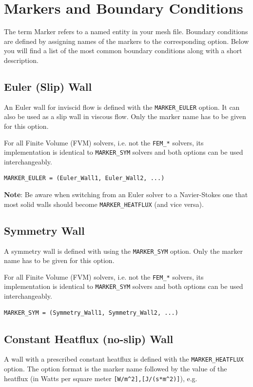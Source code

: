 \documentclass{article}
\begin{document}
\section{Markers and Boundary Conditions}

The term Marker refers to a named entity in your mesh file. Boundary conditions are defined by assigning names of the markers to the corresponding option. Below you will find a list of the most common boundary conditions along with a short description.

\subsection{Euler (Slip) Wall}
An Euler wall for inviscid flow is defined with the \verb|MARKER_EULER| option. It can also be used as a slip wall in viscous flow. Only the marker name has to be given for this option.

For all Finite Volume (FVM) solvers, i.e. not the \verb|FEM_*| solvers, its implementation is identical to \verb|MARKER_SYM| solvers and both options can be used interchangeably.

\begin{lstlisting}
MARKER_EULER = (Euler_Wall1, Euler_Wall2, ...)
\end{lstlisting}

\textbf{Note}: Be aware when switching from an Euler solver to a Navier-Stokes one that most solid walls should become \verb|MARKER_HEATFLUX| (and vice versa).

\subsection{Symmetry Wall}
A symmetry wall is defined with using the \verb|MARKER_SYM| option. Only the marker name has to be given for this option.

For all Finite Volume (FVM) solvers, i.e. not the \verb|FEM_*| solvers, its implementation is identical to \verb|MARKER_SYM| solvers and both options can be used interchangeably.

\begin{lstlisting}
MARKER_SYM = (Symmetry_Wall1, Symmetry_Wall2, ...)

\end{lstlisting}


\subsection{Constant Heatflux (no-slip) Wall}
A wall with a prescribed constant heatflux is defined with the \verb|MARKER_HEATFLUX| option. The option format is the marker name followed by the value of the heatflux (in Watts per square meter \verb|[W/m^2],[J/(s*m^2)]|), e.g.
\end{document}
